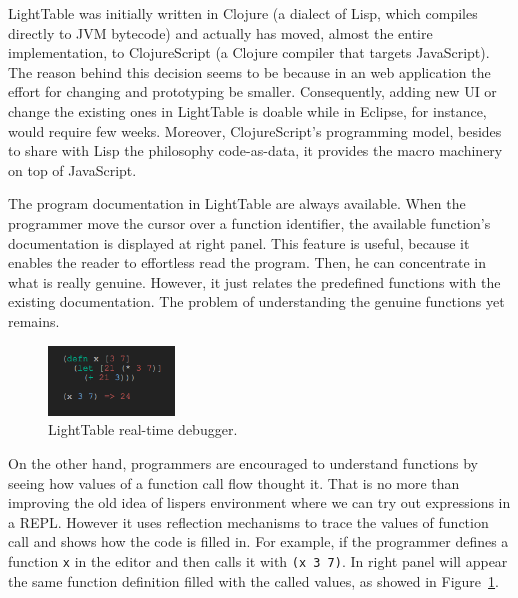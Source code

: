 LightTable was initially written in Clojure (a dialect of Lisp, which compiles directly to JVM bytecode) and actually has moved, almost the entire implementation, to ClojureScript (a Clojure compiler that targets JavaScript). The reason behind this decision seems to be because in an web application the effort for changing and prototyping be smaller. Consequently, adding new UI or change the existing ones in LightTable is doable while in Eclipse, for instance, would require few weeks. Moreover, ClojureScript's programming model, besides to share with Lisp the philosophy code-as-data, it provides the macro machinery on top of JavaScript.

The program documentation in LightTable are always available. When the programmer move the cursor over a function identifier, the available function's documentation is displayed at right panel. This feature is useful, because it enables the reader to effortless read the program. Then, he can concentrate in what is really genuine. However, it just relates the predefined functions with the existing documentation. The problem of understanding the genuine functions yet remains. 

\begin{figure}
  \vspace{-25pt}
  \begin{center}
    \includegraphics[width=0.3\textwidth]{img/eval-close}
  \end{center}
  \vspace{-20pt}
 \caption{LightTable real-time debugger.}  
  \vspace{-20pt}
    \label{fig:lt2}
\end{figure}

On the other hand, programmers are encouraged to understand functions by seeing how values of a function call flow thought it. That is no more than improving the old idea of lispers environment where we can try out expressions in a REPL. However it uses reflection mechanisms to trace the values of function call and shows how the code is filled in. For example, if the programmer defines a function \texttt{x} in the editor and then calls it with \texttt{(x 3 7)}. In right panel will appear the same function definition filled with the called values, as showed in Figure~\ref{fig:lt2}. 

